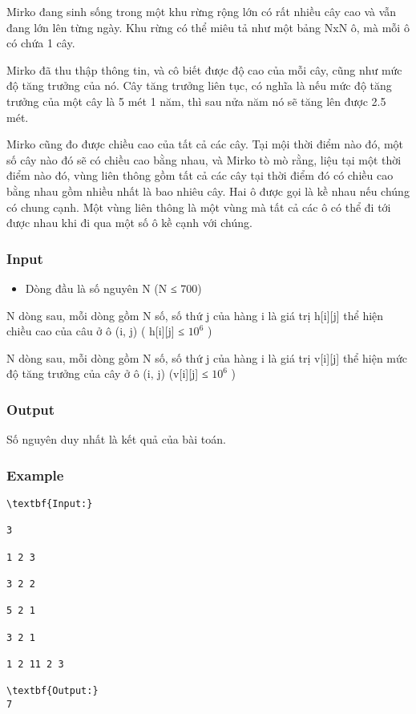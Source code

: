



   Mirko đang sinh sống trong một khu rừng rộng lớn có rất nhiều cây cao và vẫn đang lớn lên từng ngày. Khu rừng có thể miêu tả như một bảng NxN ô, mà mỗi ô có chứa 1 cây.  

   Mirko đã thu thập thông tin, và cô biết được độ cao của mỗi cây, cũng như mức độ tăng trưởng của nó. Cây tăng trưởng liên tục, có nghĩa là nếu mức độ tăng trưởng của một cây là 5 mét 1 năm, thì sau nửa năm nó sẽ tăng lên được 2.5 mét.  

   Mirko cũng đo được chiều cao của tất cả các cây. Tại mội thời điểm nào đó, một số cây nào đó sẽ có chiều cao bằng nhau, và Mirko tò mò rằng, liệu tại một thời điểm nào đó, vùng liên thông gồm tất cả các cây tại thời điểm đó có chiều cao bằng nhau gồm nhiều nhất là bao nhiêu cây. Hai ô được gọi là kề nhau nếu chúng có chung cạnh. Một vùng liên thông là một vùng mà tất cả các ô có thể đi tới được nhau khi đi qua một số ô kề cạnh với chúng.  

\subsubsection{   Input  }


\begin{itemize}
	\item     Dòng đầu là số nguyên N (N ≤ 700)   
\end{itemize}

   N dòng sau, mỗi dòng gồm N số, số thứ j của hàng i là giá trị h[i][j] thể hiện chiều cao của câu ở ô (i, j) ( h[i][j] ≤ $10^{6}$   )  

   N dòng sau, mỗi dòng gồm N số, số thứ j của hàng i là giá trị v[i][j] thể hiện mức độ tăng trưởng của cây ở ô (i, j) (v[i][j] ≤ $10^{6}$   )  

\subsubsection{   Output  }

   Số nguyên duy nhất là kết quả của bài toán.  

\subsubsection{   Example  }
\begin{verbatim}
\textbf{Input:}

3

1 2 3

3 2 2

5 2 1

3 2 1

1 2 11 2 3

\textbf{Output:}
7\end{verbatim}
